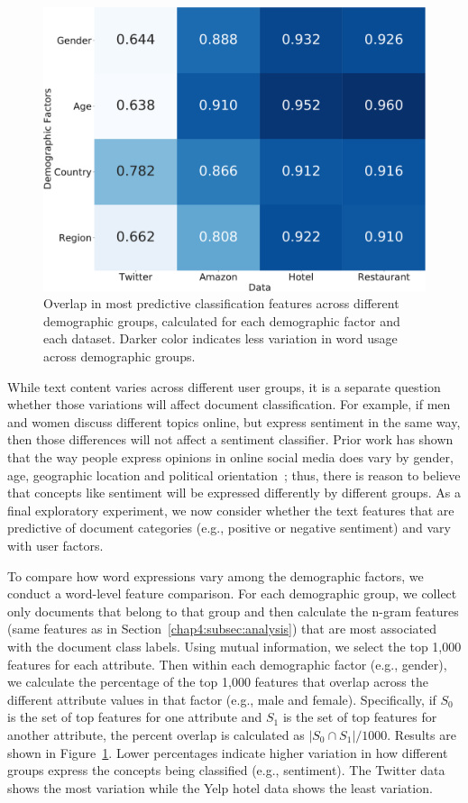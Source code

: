 \begin{figure}[t!]
\centering
\includegraphics[scale=0.35]{./images/chapter4/overlap.pdf}
\caption{Overlap in most predictive classification features across different demographic groups, calculated for each demographic factor and each dataset. Darker color indicates less variation in word usage across demographic groups.
}
\label{chap4:fig:overlap}
\end{figure}

While text content varies across different user groups,
it is a separate question whether those variations will affect document classification.
For example, if men and women discuss different topics online,
but express sentiment in the same way,
then those differences will not affect a sentiment classifier.
Prior work has shown that the way 
people express opinions in online social media 
does vary by gender, age, geographic location and political orientation~\cite{hinds2018demographic};
thus, there is reason to believe that concepts like sentiment will be expressed differently by different groups.
As a final exploratory experiment,
we now consider whether the text features that are predictive of
document categories (e.g., positive or negative sentiment)
and vary with user factors.


To compare how word expressions vary among the demographic factors, we conduct a word-level feature comparison.
For each demographic group, we collect only documents that belong to that group and then calculate the n-gram features (same features as in Section~\ref{chap4:subsec:analysis}) that are most associated with the document class labels.
Using mutual information, we select the top 1,000 features for each attribute.
Then within each demographic factor (e.g., gender),
we calculate the percentage of the top 1,000 features that overlap across the different attribute values in that factor (e.g., male and female).
Specifically, if $S_0$ is the set of top features for one attribute and $S_1$ is the set of top features for another attribute, the percent overlap is calculated as $|S_0 \cap S_1|/1000$.
Results are shown in Figure~\ref{chap4:fig:overlap}. 
Lower percentages indicate higher variation in how different groups express the concepts being classified (e.g., sentiment).
The Twitter data shows the most variation while the Yelp hotel data shows the least variation.


